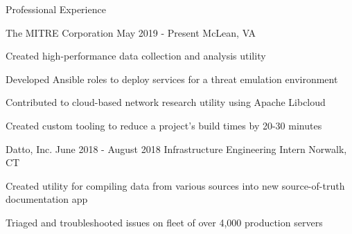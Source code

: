 \documentclass[8pt]{resume} %
\begin{document}
\begin{rSection}{Professional Experience}

    \begin{rSubsection}
        {The MITRE Corporation}
        {May 2019 - Present}
        {McLean, VA}
    \item Created high-performance data collection and analysis utility
    \item Developed Ansible roles to deploy services for a threat emulation environment
    \item Contributed to cloud-based network research utility using Apache Libcloud
    \item Created custom tooling to reduce a project's build times by 20-30 minutes
    \end{rSubsection}


    \begin{rSubsection}
        {Datto, Inc.}
        {June 2018 - August 2018}
        {Infrastructure Engineering Intern}
        {Norwalk, CT}
    \item Created utility for compiling data from various sources into new source-of-truth documentation app
    \item Triaged and troubleshooted issues on fleet of over 4,000 production servers
    \end{rSubsection}
%
%
%
%

\end{rSection}
\end{document}

